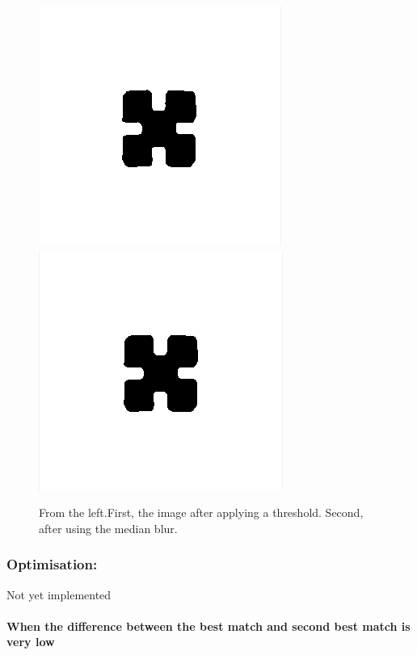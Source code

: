 \documentclass{article}
\begin{document}
\begin{figure}[h!]
\begin{minipage}{\textwidth}
\centering 
\includegraphics[scale = 0.3]{images/AfterThreshholding.png}
\hspace{1cm}
\includegraphics[scale = 0.3 ]{images/AfterMedianBlur.png}
\caption{From the left.First, the image after applying a threshold. Second, after using the median blur.}
\label{fig:Comparions_PreProcessing}
\end{minipage}
\end{figure}

\subsubsection*{Optimisation:}

Not yet implemented

\paragraph*{When the difference between the best match and second best match is very low}
\end{document}
